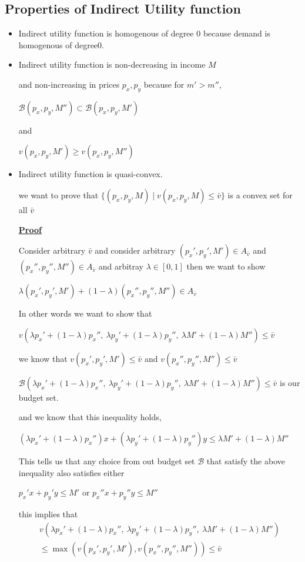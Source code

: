 \documentclass[12pt,a4paper]{article}
\begin{document}
\subsection{Properties of Indirect Utility function}
\begin{itemize}
    \item Indirect utility function is homogenous of degree \(0\) because demand is homogenous of degree\(0\).
    \item Indirect utility function is non-decreasing in income \(M\) 
    
    and non-increasing in prices \(p_{x},p_{y}\) because for \(m'>m''\),
    
    \( \mathcal{B}(p_x,p_y,M'') \subset \mathcal{B}(p_x,p_y,M') \)    
    
    and

    \(v(p_{x},p_{y},M') \geq v(p_{x},p_{y},M'')\)  
    \item Indirect utility function is quasi-convex.
    
    we want to prove that \(\{(p_{x},p_{y},M) \mid v(p_{x},p_{y},M) \leq  \bar{v} \}\) is a convex set for all \(\bar{v} \)
    
    \underline{\textbf{Proof}}

    Consider arbitrary \( \bar{v} \) and consider arbitrary \(\left( p_{x}',p_{y}',M' \right) \in A_{ \bar{v} } \) and \(\left( p_{x}'',p_{y}'',M'' \right) \in A_{ \bar{v} } \)  and arbitray \(\lambda \in [0,1]\) then we want to show 
    
    \(\lambda(p_{x}',p_{y}',M') + (1-\lambda)(p_{x}'', p_{y}'', M'') \in A_{ \bar{v}  }\)
    
    In other words we want to show that
    
    \(v(\lambda p_{x}' +(1-\lambda)p_{x}'', \ \lambda p_{y}' +(1-\lambda)p_{y}'', \ \lambda M' +(1-\lambda)M'')\leq  \bar{v}  \)  

    we know that \(v(p_{x}',p_{y}', M') \leq  \bar{v}  \) and   \(v(p_{x}'',p_{y}'', M'') \leq  \bar{v}  \)
    
    \(\mathcal{B}(\lambda p_{x}' +(1-\lambda)p_{x}'', \ \lambda p_{y}' +(1-\lambda)p_{y}'', \ \lambda M' +(1-\lambda)M'')\leq  \bar{v}  \) is our budget set.

    and we know that this inequality holds,

    \((\lambda p_{x}' +(1-\lambda)p_{x}'')x + (\lambda p_{y}' +(1-\lambda)p_{y}'')y \leq \lambda M' + (1-\lambda)M''\)  

    This tells us that any choice from out budget set \(\mathcal{B}\) that satisfy the above inequality also satisfies either 
    
    \(p_{x}'x+p_{y}'y \leq M'\)  or \(p_{x}''x+p_{y}''y \leq M''\) 
    
    this implies that 
    \begin{align*}
        v(\lambda p_{x}' +(1-\lambda)p_{x}'', \ \lambda p_{y}' +(1-\lambda)p_{y}'', \ \lambda M' +(1-\lambda)M'')\\
    \leq \max\left( v(p_{x}',p_{y}',M'),v(p_{x}'',p_{y}'',M'') \right)  \leq \bar{v} 
    \end{align*}  
\end{itemize}
\end{document}
